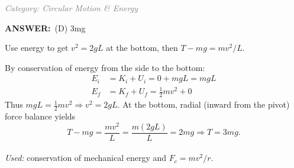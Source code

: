 ﻿\documentclass[12pt, a4paper]{article}
\makeatletter
\newcommand{\finalanswer}[1]{\textbf{ANSWER:}~#1}
\newif\if@categoryprinted
\newcommand{\category}[1]{\if@categoryprinted\relax\else\textit{\textcolor{gray}{Category: #1}}\global\@categoryprintedtrue\fi}
\makeatother
\begin{document}
\begin{CJK*}{UTF8}{gbsn}
\begin{enumerate}[itemsep=1.0em, topsep=0.6em]
\category{Circular Motion \& Energy}
\begin{answerbox}
\finalanswer{(D) 3mg}
\end{answerbox}
\begin{insightbox}
Use energy to get $v^2=2gL$ at the bottom, then $T-mg=mv^2/L$.
\end{insightbox}
\begin{solutionbox}
By conservation of energy from the side to the bottom:
\begin{align*}
E_i &= K_i + U_i = 0 + mgL = mgL \\
E_f &= K_f + U_f = \tfrac{1}{2}mv^2 + 0
\end{align*}
Thus $mgL = \tfrac{1}{2}mv^2 \Rightarrow v^2 = 2gL$. At the bottom, radial (inward from the pivot) force balance yields
\[
T - mg = \frac{mv^2}{L} = \frac{m(2gL)}{L} = 2mg \Rightarrow T = 3mg.
\]
\\
\emph{Used:} conservation of mechanical energy and $F_c=mv^2/r$.
\end{solutionbox}

\newpage


\end{enumerate}
\end{CJK*}
\end{document}
